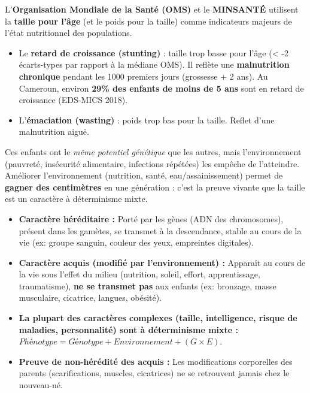 \documentclass[11pt]{article}
\begin{document}
\begin{savaistu}
L'\textbf{Organisation Mondiale de la Santé (OMS)} et le \textbf{MINSANTÉ} utilisent la \textbf{taille pour l'âge} (et le poids pour la taille) comme indicateurs majeurs de l'état nutritionnel des populations.
\begin{itemize}
    \item Le \textbf{retard de croissance (stunting)} : taille trop basse pour l'âge (< -2 écarts-types par rapport à la médiane OMS). Il reflète une \textbf{malnutrition chronique} pendant les 1000 premiers jours (grossesse + 2 ans). Au Cameroun, environ \textbf{29\% des enfants de moins de 5 ans} sont en retard de croissance (EDS-MICS 2018).
    \item L'\textbf{émaciation (wasting)} : poids trop bas pour la taille. Reflet d'une malnutrition aiguë.
\end{itemize}
Ces enfants ont le \emph{même potentiel génétique} que les autres, mais l'environnement (pauvreté, insécurité alimentaire, infections répétées) les empêche de l'atteindre. Améliorer l'environnement (nutrition, santé, eau/assainissement) permet de \textbf{gagner des centimètres} en une génération : c'est la preuve vivante que la taille est un caractère à déterminisme mixte.
\end{savaistu}

\begin{aretenir}
\begin{itemize}
    \item \textbf{Caractère héréditaire :} Porté par les gènes (ADN des chromosomes), présent dans les gamètes, se transmet à la descendance, stable au cours de la vie (ex: groupe sanguin, couleur des yeux, empreintes digitales).
    \item \textbf{Caractère acquis (modifié par l'environnement) :} Apparaît au cours de la vie sous l'effet du milieu (nutrition, soleil, effort, apprentissage, traumatisme), \textbf{ne se transmet pas} aux enfants (ex: bronzage, masse musculaire, cicatrice, langues, obésité).
    \item \textbf{La plupart des caractères complexes (taille, intelligence, risque de maladies, personnalité) sont à déterminisme mixte :} $Phénotype = Génotype + Environnement + (G \times E)$.
    \item \textbf{Preuve de non-hérédité des acquis :} Les modifications corporelles des parents (scarifications, muscles, cicatrices) ne se retrouvent jamais chez le nouveau-né.
\end{itemize}
\end{aretenir}
\end{document}
